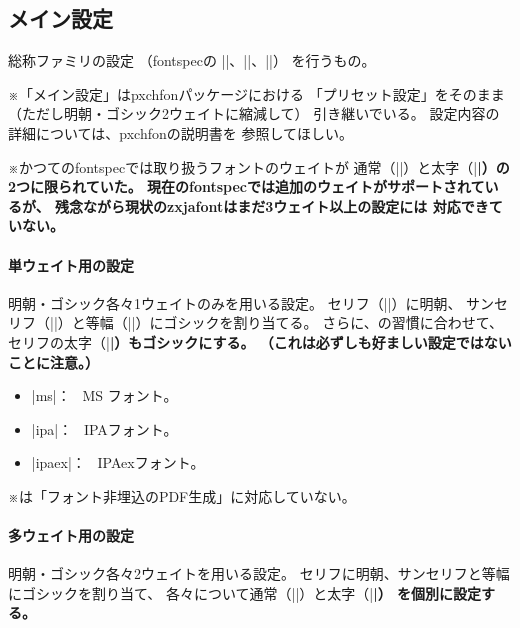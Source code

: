 \documentclass[xelatex,ja=standard,jafont=ipaex,
  a4paper]{bxjsarticle}
\newcommand{\Pkg}[1]{\textsf{#1}}
\newcommand{\Note}{\par\noindent ※}
\newcommand{\Means}{：\ }
\begin{document}
\subsection{メイン設定}

総称ファミリの設定
（\Pkg{fontspec}の |\setmainfont|、|\setsansfont|、|\setmonofont|）
を行うもの。

\Note 「メイン設定」は\Pkg{pxchfon}パッケージにおける
「プリセット設定」をそのまま
（ただし明朝・ゴシック2ウェイトに縮減して）
引き継いでいる。
設定内容の詳細については、\Pkg{pxchfon}の説明書を
参照してほしい。

\Note かつての\Pkg{fontspec}では取り扱うフォントのウェイトが
通常（|\mdseries|）と太字（|\bfseries|）の2つに限られていた。
現在の\Pkg{fontspec}では追加のウェイトがサポートされているが、
残念ながら現状の\Pkg{zxjafont}はまだ3ウェイト以上の設定には
対応できていない。

\paragraph{単ウェイト用の設定}
明朝・ゴシック各々1ウェイトのみを用いる設定。
セリフ（|\rmfamily|）に明朝、
サンセリフ（|\sffamily|）と等幅（|\ttfamily|）にゴシックを割り当てる。
さらに、{\pLaTeX}\>の習慣に合わせて、
セリフの太字（|\bfseries|）もゴシックにする。
（これは必ずしも好ましい設定ではないことに注意。）

\begin{itemize}
\item |ms|\Means
MS フォント。
\item |ipa|\Means
IPAフォント。
\item |ipaex|\Means
IPAexフォント。
\end{itemize}
\Note {\XeTeX}\>は「フォント非埋込のPDF生成」に対応していない。

\paragraph{多ウェイト用の設定}
明朝・ゴシック各々2ウェイトを用いる設定。
セリフに明朝、サンセリフと等幅にゴシックを割り当て、
各々について通常（|\mdseries|）と太字（|\bfseries|）
を個別に設定する。
\end{document}
